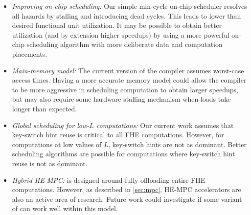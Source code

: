 \begin{itemize}
	\item \emph{Improving on-chip scheduling:} Our simple min-cycle on-chip scheduler resolves all hazards by stalling and introducing dead cycles. This leads to lower than desired functional unit utilization. It may be possible to obtain better utilization (and by extension higher speedups) by using a more powerful on-chip scheduling algorithm with more deliberate data and computation placements.
	\item \emph{Main-memory model:} The current version of the \name compiler assumes worst-case access times. Having a more accurate memory model could allow the compiler to be more aggressive in scheduling computation to obtain larger speedups, but may also require some hardware stalling mechanism when loads take longer than expected.
	\item \emph{Global scheduling for low-$L$ computations:} Our current work assumes that key-switch hint reuse is critical to all FHE computations. However, for computations at low values of $L$, key-switch hints are not as dominant. Better scheduling algorithms are possible for computations where key-switch hint reuse is not as dominant.
	\item \emph{Hybrid HE-MPC:} \name is designed around fully offloading entire FHE computations. However, as described in \autoref{sec:mpc}, HE-MPC accelerators are also an active area of research. Future work could investigate if some variant of \name can work well within this model.
\end{itemize}